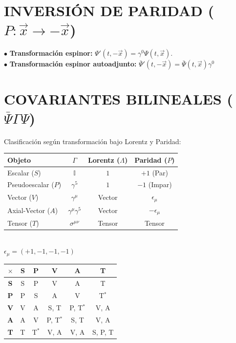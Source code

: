 \section{INVERSIÓN DE PARIDAD ($P: \vec{x} \to -\vec{x}$)}
$\bullet$ \textbf{Transformación espinor: }$\Psi'(t, -\vec{x}) = \gamma^0 \Psi(t, \vec{x})$.\\
$\bullet$ \textbf{Transformación espinor autoadjunto:} $\bar{\Psi}'(t, -\vec{x}) = \bar{\Psi}(t, \vec{x})\gamma^0 $


\section{COVARIANTES BILINEALES ($\bar{\Psi} \Gamma \Psi$)}
Clasificación según transformación bajo Lorentz y Paridad: 
\begin{center}
\begin{tabular}{|l|c|c|c|}
\hline
Objeto & $\Gamma$ & Lorentz ($\Lambda$) & Paridad ($P$) \\ \hline
Escalar ($S$) & $\mathbb{I}$ & $1$ & $+1$ (Par) \\
Pseudoescalar ($P$) & $\gamma^5$ & $1$ & $-1$ (Impar) \\
Vector ($V$) & $\gamma^\mu$ & Vector & $\epsilon_\mu$ \\
Axial-Vector ($A$) & $\gamma^\mu \gamma^5$ & Vector & $-\epsilon_\mu$ \\
Tensor ($T$) & $\sigma^{\mu\nu}$ & Tensor & Tensor \\ \hline
\end{tabular}\\
 $\epsilon_\mu = (+1, -1, -1, -1)$\\
\begin{tabular}{|c|c|c|c|c|c|}
\hline
$\times$ & \textbf{S} & \textbf{P} & \textbf{V} & \textbf{A} & \textbf{T} \\
\hline\textbf{S} & S & P & V & A & T \\
\hline
\textbf{P} & P & S & A & V & T$^*$ \\
\hline
\textbf{V} & V & A & S, T & P, T$^*$ & V, A \\
\hline
\textbf{A} & A & V & P, T$^*$ & S, T & V, A \\
\hline
\textbf{T} & T & T$^*$ & V, A & V, A & S, P, T \\
\hline
\end{tabular}
\end{center}


